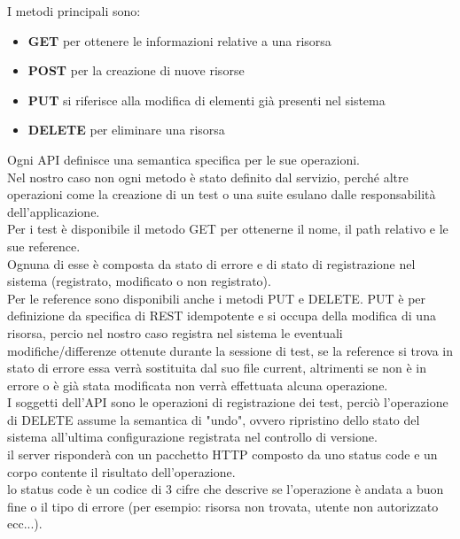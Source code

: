         I metodi principali sono:
        
        \begin{itemize}
            \item \textbf{GET} per ottenere le informazioni relative a una risorsa
            \item \textbf{POST} per la creazione di nuove risorse
            \item \textbf{PUT} si riferisce alla modifica di elementi già presenti nel sistema
            \item \textbf{DELETE} per eliminare una risorsa
        \end{itemize}
        
        Ogni API definisce una semantica specifica per le sue operazioni.\\
        Nel nostro caso non ogni metodo è stato definito dal servizio, perché altre operazioni come la creazione di un test o una suite esulano dalle responsabilità dell'applicazione.\\
        
        Per i test è disponibile il metodo GET per ottenerne il nome, il path relativo e le sue reference.\\
        Ognuna di esse è composta da stato di errore e di stato di registrazione nel sistema (registrato, modificato o non registrato).\\
        Per le reference sono disponibili anche i metodi PUT e DELETE. PUT è per definizione da specifica di REST idempotente e si occupa della modifica di una risorsa, percio nel nostro caso registra nel sistema le eventuali modifiche/differenze ottenute durante la sessione di test, se la reference si trova in stato di errore essa verrà sostituita dal suo file current, altrimenti se non è in errore o è già stata modificata non verrà effettuata alcuna operazione.\\
        
        I soggetti dell'API sono le operazioni di registrazione dei test, perciò l'operazione di DELETE assume la semantica di "undo", ovvero ripristino dello stato del sistema all'ultima configurazione registrata nel controllo di versione.\\
        
        il server risponderà con un pacchetto HTTP composto da uno status code e un corpo contente il risultato dell'operazione.\\
        lo status code è un codice di 3 cifre che descrive se l'operazione è andata a buon fine o il tipo di errore (per esempio: risorsa non trovata, utente non autorizzato ecc...).\\
        